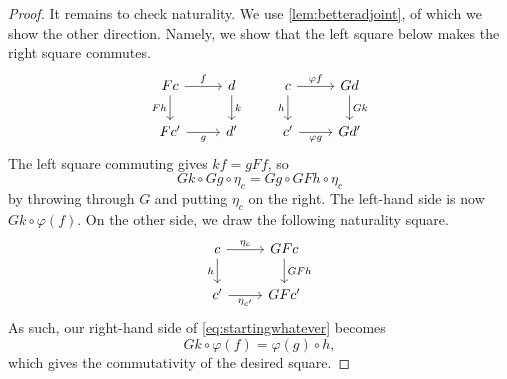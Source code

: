 \begin{proof}
	It remains to check naturality. We use \autoref{lem:betteradjoint}, of which we show the other direction. Namely, we show that the left square below makes the right square commutes.
	\[\begin{tikzcd}[ampersand replacement=\&]
		Fc \& d \& c \& Gd \\
		{Fc'} \& {d'} \& {c'} \& {Gd'}
		\arrow["{f}", from=1-1, to=1-2]
		\arrow["{g}"', from=2-1, to=2-2]
		\arrow["Fh"', from=1-1, to=2-1]
		\arrow["k", from=1-2, to=2-2]
		\arrow["h"', from=1-3, to=2-3]
		\arrow["{\varphi f}", from=1-3, to=1-4]
		\arrow["{\varphi g}"', from=2-3, to=2-4]
		\arrow["Gk", from=1-4, to=2-4]
	\end{tikzcd}\]
	The left square commuting gives $kf=gFf$, so
	\[Gk\circ Gg\circ\eta_c=Gg\circ GFh\circ\eta_c\tag{$*$}\label{eq:startingwhatever}\]
	by throwing through $G$ and putting $\eta_c$ on the right. The left-hand side is now $Gk\circ\varphi(f)$. On the other side, we draw the following naturality square.
	\[\begin{tikzcd}
		c & GFc \\
		{c'} & {GFc'}
		\arrow["h"', from=1-1, to=2-1]
		\arrow["GFh", from=1-2, to=2-2]
		\arrow["{\eta_c}", from=1-1, to=1-2]
		\arrow["{\eta_{c'}}"', from=2-1, to=2-2]
	\end{tikzcd}\]
	As such, our right-hand side of \autoref{eq:startingwhatever} becomes
	\[Gk\circ\varphi(f)=\varphi(g)\circ h,\]
	which gives the commutativity of the desired square.
\end{proof}

